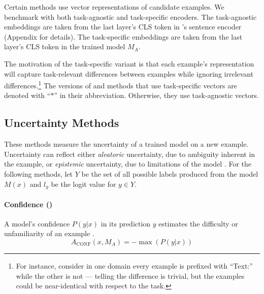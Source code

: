 Certain methods use vector representations of candidate examples.
We benchmark with both task-agnostic and task-specific encoders.
The task-agnostic embeddings are taken from the last layer's CLS token in \citet{reimers-2019-sentence-bert}'s sentence encoder (Appendix for details).
The task-specific embeddings are taken from the last layer's CLS token in the trained model $M_A$.

The motivation of the task-specific variant is that each example's representation will capture task-relevant differences between examples while ignoring irrelevant differences.\footnote{For instance, consider in one domain every example is prefixed with ``Text:'' while the other is not --- telling the difference is trivial, but the examples could be near-identical with respect to the task.}
The versions of \dal{} and \knn{} methods that use task-specific vectors are denoted with ``$*$'' in their abbreviation. 
Otherwise, they use task-agnostic vectors.

    \subsection{Uncertainty Methods}
    \label{sec:uncertainty-methods}
    \respace
    These methods measure the uncertainty of a trained model on a new example.
    Uncertainty can reflect either \textit{aleatoric} uncertainty, due to ambiguity inherent in the example, or \textit{epistemic} uncertainty, due to limitations of the model \citep{kendall2017uncertainties}.
    For the following methods, let $Y$ be the set of all possible labels produced from the model $M(x)$ and $l_y$ be the logit value for $y \in Y$.

        \paragraph{Confidence (\conf)}
        A model's confidence $P(y|x)$ in its prediction $y$ estimates the difficulty or unfamiliarity of an example \citep{guo2017calibration, elsahar-galle-2019-annotate}.
        \respace
        $$ A_{\text{CONF}}(x, M_A) = -\max(P(y|x))$$ 
        \respace
